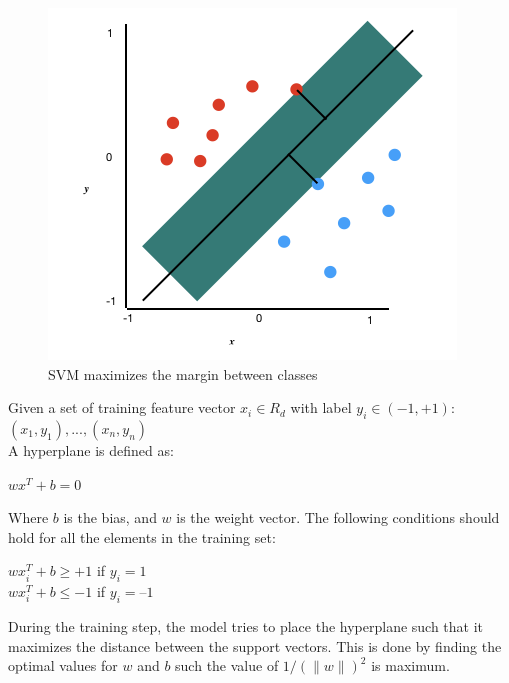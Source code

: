 \begin{figure}[htb!]
    \centering
    \includegraphics[scale=0.75]{files/svm.png}
    \caption{SVM maximizes the margin between classes}
    \label{SVM maximizes the margin between classes}
    \end{figure}
    \FloatBarrier
    
Given a set of training feature vector $x_i \in R_d$ with label $y_i \in (−1, +1)$: $(x_1, y_1), ..., (x_n, y_n)$ \\
A hyperplane is defined as:
\begin{center}
    $wx^T + b=0$
\end{center}
Where $b$ is the bias, and $w$ is the weight vector. The following conditions should hold for all the elements in the training set:
\begin{center}
    $wx_i^T + b \geq +1$ if $y_i=1$\\
    $wx_i^T + b \leq −1$ if $y_i=–1$
\end{center}
During the training step, the model tries to place the hyperplane such that it maximizes the distance between the support vectors. This is done by finding the optimal values for $w$ and $b$ such the value of $1/(\parallel w\parallel)^2$ is maximum.

